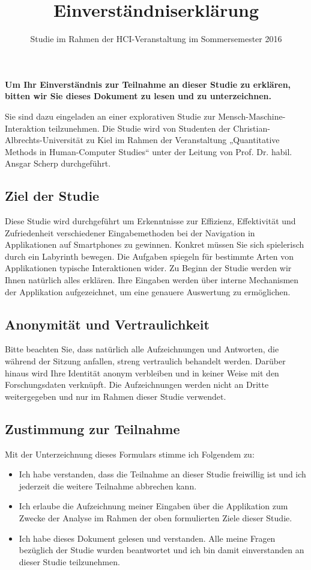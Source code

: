 \documentclass[10pt,a4paper]{scrartcl}
\title{Einverständniserklärung}
\subtitle{Studie im Rahmen der HCI-Veranstaltung im Sommersemester 2016}
\date{\vspace{-5ex}}
\begin{document}
\maketitle
\pagestyle{empty}

\vspace{0.5 cm}

\noindent
\textbf{Um Ihr Einverständnis zur Teilnahme an dieser Studie zu erklären, bitten wir Sie dieses Dokument zu lesen und zu unterzeichnen.}

\vspace{2 ex}
\noindent
Sie sind dazu eingeladen an einer explorativen Studie zur Mensch-Maschine-Interaktion teilzunehmen. Die Studie wird von Studenten der Christian-Albrechts-Universität zu Kiel im Rahmen der Veranstaltung „Quantitative Methods in Human-Computer Studies“ unter der Leitung von Prof. Dr. habil. Ansgar Scherp durchgeführt.

\subsection*{Ziel der Studie}
Diese Studie wird durchgeführt um Erkenntnisse zur Effizienz, Effektivität und Zufriedenheit verschiedener Eingabemethoden bei der Navigation in Applikationen auf Smartphones zu gewinnen. Konkret müssen Sie sich spielerisch durch ein Labyrinth bewegen. Die Aufgaben spiegeln für bestimmte Arten von Applikationen typische Interaktionen wider. Zu Beginn der Studie werden wir Ihnen natürlich alles erklären.
Ihre Eingaben werden über interne Mechanismen der Applikation aufgezeichnet, um eine genauere Auswertung zu ermöglichen.

\subsection*{Anonymität und Vertraulichkeit}
Bitte beachten Sie, dass natürlich alle Aufzeichnungen und Antworten, die während der Sitzung anfallen, streng vertraulich behandelt werden. Darüber hinaus wird Ihre Identität anonym verbleiben und in keiner Weise mit den Forschungsdaten verknüpft. Die Aufzeichnungen werden nicht an Dritte weitergegeben und nur im Rahmen dieser Studie verwendet.

\subsection*{Zustimmung zur Teilnahme}
Mit der Unterzeichnung dieses Formulars stimme ich Folgendem zu:
\begin{itemize}
	\item Ich habe verstanden, dass die Teilnahme an dieser Studie freiwillig ist und ich jederzeit die weitere Teilnahme abbrechen kann.
	\item Ich erlaube die Aufzeichnung meiner Eingaben über die Applikation zum Zwecke der Analyse im Rahmen der oben formulierten Ziele dieser Studie.
	\item Ich habe dieses Dokument gelesen und verstanden. Alle meine Fragen bezüglich der Studie wurden beantwortet und ich bin damit einverstanden an dieser Studie teilzunehmen.
\end{itemize}
\end{document}
